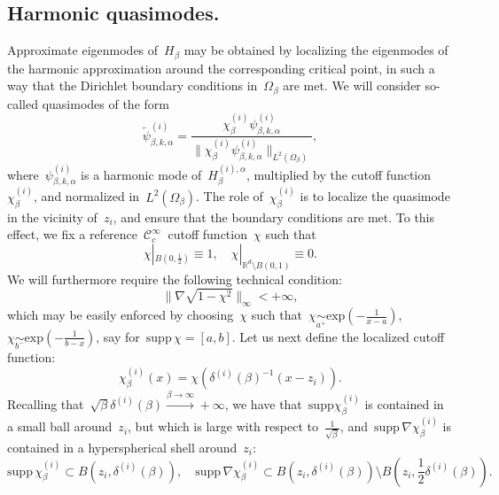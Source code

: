 \documentclass[10pt]{article}
\newcommand{\R}{\mathbb{R}}
\newcommand{\1}{\mathbbm 1}
\newcommand{\supp}{\mathrm{supp}}
\newcommand{\deltai}{\delta^{(i)}}
\begin{document}
    \subsection{Harmonic quasimodes.}\label{subsec:quasimodes}
    Approximate eigenmodes of~$H_\beta$ may be obtained by localizing the eigenmodes of the harmonic approximation around the corresponding critical point, in such a way that the Dirichlet boundary conditions in~$\Omega_\beta$ are met.
    We will consider so-called quasimodes of the form
    \begin{equation}
        \label{eq:harm_quasimode}
        \widetilde\psi^{(i)}_{\beta,k,\alpha} = \frac{\chi_\beta^{(i)}\psi_{\beta,k,\alpha}^{(i)}}{\|\chi_\beta^{(i)}\psi_{\beta,k,\alpha}^{(i)}\|_{L^2(\Omega_\beta)}},
    \end{equation}
    where~$\psi_{\beta,k,\alpha}^{(i)}$ is a harmonic mode of~$H_\beta^{(i),\alpha}$, multiplied by the cutoff function~$\chi_\beta^{(i)}$, and normalized in~$L^2(\Omega_\beta)$.
    The role of~$\chi_\beta^{(i)}$ is to localize the quasimode in the vicinity of~$z_i$, and ensure that the boundary conditions are met. To this effect, we fix a reference~$\mathcal C_c^\infty~$ cutoff function~$\chi$ such that
    \[\chi|_{B\left(0,\frac12\right)}\equiv 1,\quad \chi|_{\R^d\setminus B(0,1)} \equiv 0.\]
    We will furthermore require the following technical condition:
    \begin{equation}
        \label{eq:partition_of_unity_condition}
        \|\nabla\sqrt{1-\chi^2}\|_\infty < +\infty,
    \end{equation}
    which may be easily enforced by choosing~$\chi$ such that~$\chi \underset{a^+}{\sim} \mathrm{exp}\left(-\frac1{x-a}\right)$,~$\chi\underset{b^-}{\sim}\mathrm{exp}\left(-\frac1{b-x}\right)$, say for~$\supp\,\chi = [a,b]$.
    Let us next define the localized cutoff function:
    \begin{equation}
        \label{eq:cutoff}
        \chi_\beta^{(i)}(x) = \chi(\deltai(\beta)^{-1}(x-z_i)).
    \end{equation}
    Recalling that~$\sqrt\beta\deltai(\beta)\overset{\beta\to\infty}{\longrightarrow} + \infty$, we have that~$\supp \chi_\beta^{(i)}$ is contained in a small ball around~$z_i$, but which is large with respect to~$\frac1{\sqrt\beta}$, and~$\supp\,\nabla \chi_\beta^{(i)}$ is contained in a hyperspherical shell around~$z_i$:
    \begin{equation}
        \label{eq:cutoff_supports}
        \supp\,\chi_\beta^{(i)} \subset B(z_i,\deltai(\beta)),\quad\supp\,\nabla\chi_\beta^{(i)} \subset B(z_i,\deltai(\beta))\setminus B\left(z_i,\frac12\deltai(\beta)\right).
    \end{equation}
\end{document}
